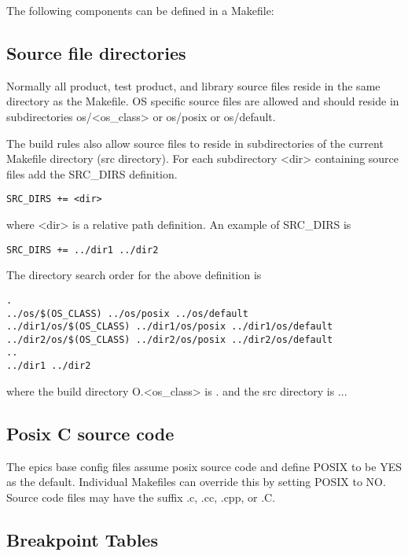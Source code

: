 The following components can be defined in a Makefile:

\subsection{Source file directories}

Normally all product, test product, and library source files reside in the same directory as the Makefile. OS specific source 
files are allowed and should reside in subdirectories os/\textless{}os\_class\textgreater{} or os/posix or os/default. 

The build rules also allow source files to reside in subdirectories of the current Makefile directory (src directory). For 
each subdirectory \textless{}dir\textgreater{} containing source files add the SRC\_DIRS definition. 

\begin{verbatim}SRC_DIRS += <dir>
\end{verbatim}where \textless{}dir\textgreater{} is a relative path definition. An example of SRC\_DIRS is

\begin{verbatim}SRC_DIRS += ../dir1 ../dir2
\end{verbatim}The directory search order for the above definition is 

\begin{verbatim}. 
../os/$(OS_CLASS) ../os/posix ../os/default
../dir1/os/$(OS_CLASS) ../dir1/os/posix ../dir1/os/default 
../dir2/os/$(OS_CLASS) ../dir2/os/posix ../dir2/os/default
..
../dir1 ../dir2
\end{verbatim}where the build directory O.\textless{}os\_class\textgreater{} is . and the src directory is ... 

\subsection{Posix C source code}

The epics base config files assume posix source code and define POSIX to be YES as the default. Individual Makefiles 
can override this by setting POSIX to NO. Source code files may have the suffix .c, .cc, .cpp, or .C.

\subsection{Breakpoint Tables}

